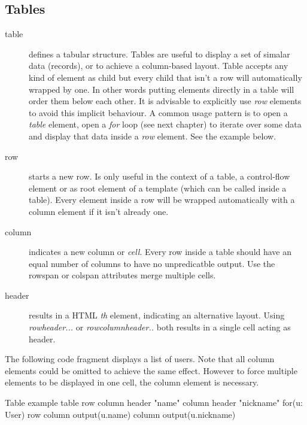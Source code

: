 \subsection{Tables}
\begin{description}
	\item[table{}] defines a tabular structure. Tables are useful to display a set of simalar data (records), or to achieve a column-based layout. Table accepts any kind of element as child but every child that isn't a row will automatically wrapped by one. In other words putting elements directly in a table will order them below each other. It is advisable to explicitly use \emph{row} elements to avoid this implicit behaviour. A common usage pattern is to open a \emph{table} element, open a \emph{for} loop (see next chapter) to iterate over some data and display that data inside a \emph{row} element. See the example below. 
	\item[row{}] starts a new row. Is only useful in the context of a table, a control-flow element or as root element of a template (which can be called inside a table). Every element inside a row will be wrapped automatically with a column element if it isn't already one. 
	\item[column{}] indicates a new column or \emph{cell}. Every row inside a table should have an equal number of columns to have no unpredicatble output. Use the rowspan or colspan attributes merge multiple cells. 
	\item[header{}] results in a HTML \emph{th} element, indicating an alternative layout. Using \emph{row{header{...}}} or \emph{row{column{header{..}}}} both results in a single cell acting as header. 
\end{description}
The following code fragment displays a list of users. Note that all column elements could be omitted to achieve the same effect. However to force multiple elements to be displayed in one cell, the column element is necessary. 
\begin{webdsl}{Table example}
table {
	row { column { header { "name" } } column { header { "nickname" } } }
	for(u: User) {
		row { 
			column { output(u.name) } 
			column { output(u.nickname) }
		}
	}
}
\end{webdsl}

